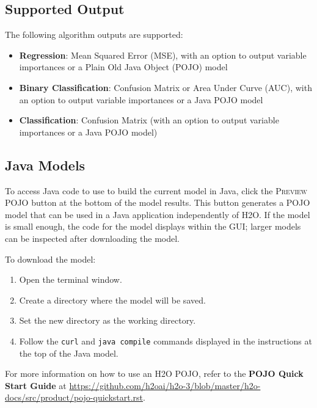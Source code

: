 \begin{minipage}{\textwidth}
\subsection{Supported Output}
The following algorithm outputs are supported:

\begin{itemize}
\item {\bf{Regression}}: Mean Squared Error (MSE), with an option to output variable importances or a Plain Old Java Object (POJO) model

\item {\bf{Binary Classification}}: Confusion Matrix or Area Under Curve (AUC), with an option to output variable importances or a Java POJO model

\item {\bf{Classification}}: Confusion Matrix (with an option to output variable importances or a Java POJO model)
\end{itemize}
\end{minipage}

\newpage
\subsection{Java Models}

To access Java code to use to build the current model in Java, click the \textsc{Preview POJO} button at the bottom of the model results. This button generates a POJO model that can be used in a Java application independently of H2O. If the model is small enough, the code for the model displays within the GUI; larger models can be inspected after downloading the model.

To download the model:
\begin{enumerate}
\item Open the terminal window.
\item Create a directory where the model will be saved.
\item Set the new directory as the working directory.
\item Follow the \texttt{curl} and \texttt{java compile} commands displayed in the instructions at the top of the Java model.
\end{enumerate}

For more information on how to use an H2O POJO, refer to the \textbf{POJO Quick Start Guide} at {\url{https://github.com/h2oai/h2o-3/blob/master/h2o-docs/src/product/pojo-quickstart.rst}}. 

